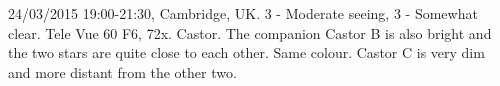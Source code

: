 \item 24/03/2015 19:00-21:30, Cambridge, UK. 3 - Moderate seeing, 3 - Somewhat clear. Tele Vue 60 F6, 72x. Castor. The companion Castor B is also bright and the two stars are quite close to each other. Same colour. Castor C is very dim and more distant from the other two.
